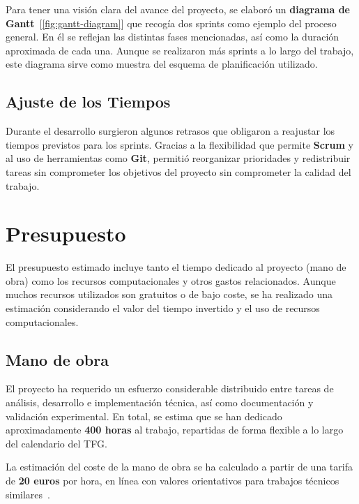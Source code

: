 Para tener una visión clara del avance del proyecto, se elaboró un \textbf{diagrama de Gantt}~[\ref{fig:gantt-diagram}]
que recogía dos sprints como ejemplo del proceso general.
En él se reflejan las distintas fases mencionadas, así como la duración aproximada de cada una.
Aunque se realizaron más sprints a lo largo del trabajo, este diagrama sirve como muestra del esquema de planificación
utilizado.

\subsection{Ajuste de los Tiempos}\label{subsec:ajuste-de-los-tiempos}
Durante el desarrollo surgieron algunos retrasos que obligaron a reajustar los tiempos previstos para los sprints.
Gracias a la flexibilidad que permite \textbf{Scrum} y al uso de herramientas como \textbf{Git},
permitió reorganizar prioridades y redistribuir tareas sin comprometer los objetivos del proyecto sin comprometer la calidad del trabajo.

\section{Presupuesto}\label{sec:presupuesto}
El presupuesto estimado incluye tanto el tiempo dedicado al proyecto (mano de obra) como los recursos computacionales y
otros gastos relacionados.
Aunque muchos recursos utilizados son gratuitos o de bajo coste, se ha realizado una estimación considerando el valor
del tiempo invertido y el uso de recursos computacionales.

\subsection{Mano de obra}\label{subsec:mano-de-obra}
El proyecto ha requerido un esfuerzo considerable distribuido entre tareas de análisis, desarrollo e implementación técnica, 
así como documentación y validación experimental. 
En total, se estima que se han dedicado aproximadamente \textbf{400 horas} al trabajo, repartidas de forma flexible a lo largo del calendario del TFG.

La estimación del coste de la mano de obra se ha calculado a partir de una tarifa de \textbf{20 euros} por hora, 
en línea con valores orientativos para trabajos técnicos similares~\cite{SalarioParaData}. 

